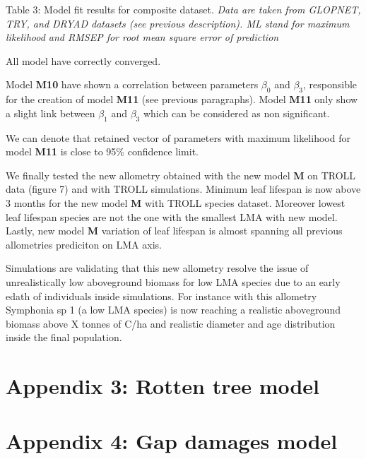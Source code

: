 \documentclass[12pt,]{article}
\let\oldsection\section
\renewcommand\section{\newpage\oldsection}
\theoremstyle{definition}
\theoremstyle{definition}
\theoremstyle{remark}
\begin{document}
Table 3: Model fit results for composite dataset. \emph{Data are taken
from GLOPNET, TRY, and DRYAD datasets (see previous description). ML
stand for maximum likelihood and RMSEP for root mean square error of
prediction}

All model have correctly converged.

Model \textbf{M10} have shown a correlation between parameters
\(\beta_0\) and \(\beta_3\), responsible for the creation of model
\textbf{M11} (see previous paragraphs). Model \textbf{M11} only show a
slight link between \(\beta_1\) and \(\beta_3\) which can be considered
as non significant.

We can denote that retained vector of parameters with maximum likelihood
for model \textbf{M11} is close to 95\% confidence limit.

We finally tested the new allometry obtained with the new model
\textbf{M} on TROLL data (figure 7) and with TROLL simulations. Minimum
leaf lifespan is now above 3 months for the new model \textbf{M} with
TROLL species dataset. Moreover lowest leaf lifespan species are not the
one with the smallest LMA with new model. Lastly, new model \textbf{M}
variation of leaf lifespan is almost spanning all previous allometries
prediciton on LMA axis.

Simulations are validating that this new allometry resolve the issue of
unrealistically low aboveground biomass for low LMA species due to an
early edath of individuals inside simulations. For instance with this
allometry Symphonia sp 1 (a low LMA species) is now reaching a realistic
aboveground biomass above X tonnes of C/ha and realistic diameter and
age distribution inside the final population.

\hypertarget{appendix-3-rotten-tree-model}{\section{Appendix 3: Rotten
tree model}\label{appendix-3-rotten-tree-model}}

\hypertarget{appendix-4-gap-damages-model}{\section{Appendix 4: Gap
damages model}\label{appendix-4-gap-damages-model}}


\listoftables
\listoffigures

  \newpage
\end{document}
